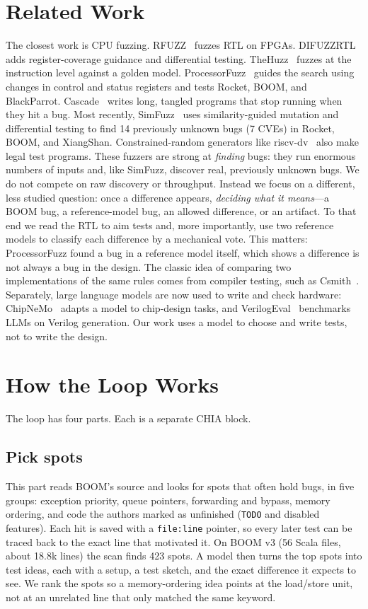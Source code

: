 \documentclass[conference]{IEEEtran}
\newcommand{\code}[1]{\texttt{\small #1}}
\begin{document}
\section{Related Work}
The closest work is CPU fuzzing. RFUZZ~\cite{rfuzz} fuzzes RTL on FPGAs.
DIFUZZRTL~\cite{difuzzrtl} adds register-coverage guidance and differential
testing. TheHuzz~\cite{thehuzz} fuzzes at the instruction level against a golden
model. ProcessorFuzz~\cite{processorfuzz} guides the search using changes in
control and status registers and tests Rocket, BOOM, and BlackParrot.
Cascade~\cite{cascade} writes long, tangled programs that stop running when they
hit a bug. Most recently, SimFuzz~\cite{simfuzz} uses similarity-guided mutation
and differential testing to find 14 previously unknown bugs (7 CVEs) in Rocket,
BOOM, and XiangShan. Constrained-random generators like riscv-dv~\cite{riscvdv}
also make legal test programs. These fuzzers are strong at \emph{finding} bugs: they run enormous numbers of
inputs and, like SimFuzz, discover real, previously unknown bugs. We do not
compete on raw discovery or throughput. Instead we focus on a different, less
studied question: once a difference appears, \emph{deciding what it means}---a
BOOM bug, a reference-model bug, an allowed difference, or an artifact. To that
end we read the RTL to aim tests and, more importantly, use two reference models
to classify each difference by a mechanical vote. This matters:
ProcessorFuzz found a bug in a reference model itself, which shows a difference
is not always a bug in the design. The classic idea of comparing two
implementations of the same rules comes from compiler testing, such as
Csmith~\cite{csmith}. Separately, large language models are now used to write
and check hardware: ChipNeMo~\cite{chipnemo} adapts a model to chip-design tasks,
and VerilogEval~\cite{verilogeval} benchmarks LLMs on Verilog generation. Our
work uses a model to choose and write tests, not to write the design.

\section{How the Loop Works}
The loop has four parts. Each is a separate CHIA block.

\subsection{Pick spots}
This part reads BOOM's source and looks for spots that often hold bugs, in five
groups: exception priority, queue pointers, forwarding and bypass, memory
ordering, and code the authors marked as unfinished (\code{TODO} and disabled
features). Each hit is saved with a \code{file:line} pointer, so every later
test can be traced back to the exact line that motivated it. On BOOM v3 (56
Scala files, about 18.8k lines) the scan finds 423 spots. A model then turns the
top spots into test ideas, each with a setup, a test sketch, and the exact
difference it expects to see. We rank the spots so a memory-ordering idea points
at the load/store unit, not at an unrelated line that only matched the same
keyword.
\end{document}
